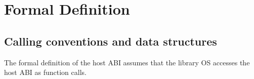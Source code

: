 






\section{Formal Definition}


\subsection{Calling conventions and data structures}


The formal definition of the host ABI assumes that 
the library OS accesses the host ABI as function calls.






